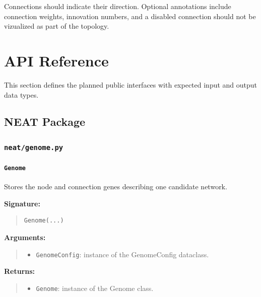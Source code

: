 \documentclass[11pt]{article}
\begin{document}
Connections should indicate their direction. Optional annotations
include connection weights, innovation numbers, and a disabled connection should not be vizualized as part of the topology.



\section{API Reference}

This section defines the planned public interfaces with expected input and output data types.

\subsection{NEAT Package}

\subsubsection{\texttt{neat/genome.py}}

\paragraph{\texttt{Genome}}

Stores the node and connection genes describing one candidate network.


\textbf{Signature:}
\begin{quote}
\begin{verbatim}
Genome(...)
\end{verbatim}
\end{quote}

\textbf{Arguments:}
\begin{quote}
\begin{itemize}
    \item \texttt{GenomeConfig}: instance of the GenomeConfig dataclass.
\end{itemize}
\end{quote}

\textbf{Returns:}
\begin{quote}
\begin{itemize}
    \item \texttt{Genome}: instance of the Genome class.
\end{itemize}
\end{quote}
\end{document}
